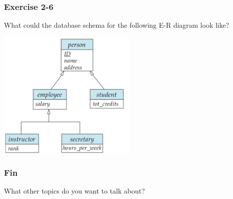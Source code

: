 \begin{frame}
\frametitle{Exercise 2-6}

What could the database schema for the following E-R diagram look like?

\begin{center}
  \includegraphics[width=0.5\textwidth]{images/specialization-generalization}
\end{center}

\end{frame}


\begin{frame}
\frametitle{Fin}

What other topics do you want to talk about?

\end{frame}

